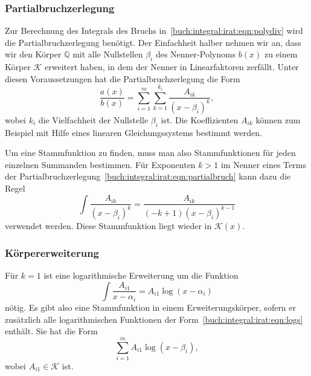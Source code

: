 \subsubsection{Partialbruchzerlegung}
Zur Berechnung des Integrals des Bruchs
in~\eqref{buch:integral:irat:eqn:polydiv} wird die Partialbruchzerlegung
benötigt.
Der Einfachheit halber nehmen wir an, dass wir den Körper $\mathbb{Q}$
mit alle Nullstellen $\beta_i$ des Nenner-Polynoms $b(x)$ zu einem Körper
$\mathscr{K}$ erweitert haben, in dem der Nenner in Linearfaktoren zerfällt.
Unter diesen Voraussetzungen hat die Partialbruchzerlegung die Form
\begin{equation}
\frac{a(x)}{b(x)}
=
\sum_{i=1}^m
\sum_{k=1}^{k_i}
\frac{A_{ik}}{(x-\beta_i)^k},
\label{buch:integral:irat:eqn:partialbruch}
\end{equation}
wobei $k_i$ die Vielfachheit der Nullstelle $\beta_i$ ist.
Die Koeffizienten $A_{ik}$ können zum Beispiel mit Hilfe eines linearen
Gleichungssystems bestimmt werden.

Um eine Stammfunktion zu finden, muss man also Stammfunktionen für
jeden einzelnen Summanden bestimmen.
Für Exponenten $k>1$ im Nenner eines Terms der
Partialbruchzerlegung~\eqref{buch:integral:irat:eqn:partialbruch}
kann dazu die Regel
\[
\int \frac{A_{ik}}{(x-\beta_i)^k}
=
\frac{A_{ik}}{(-k+1)(x-\beta_i)^{k-1}}
\]
verwendet werden.
Diese Stammfunktion liegt wieder in $\mathscr{K}(x)$.

%
%
\subsubsection{Körpererweiterung}
Für $k=1$ ist eine logarithmische Erweiterung um die Funktion
\begin{equation}
\int \frac{A_{i1}}{x-\alpha_i}
=
A_{i1}
\log(x-\alpha_i)
\label{buch:integral:irat:eqn:logs}
\end{equation}
nötig.
Es gibt also eine Stammfunktion in einem Erweiterungskörper, sofern
er zusätzlich alle logarithmischen Funktionen
der Form~\ref{buch:integral:irat:eqn:logs} enthält.
Sie hat die Form
\[
\sum_{i=1}^m A_{i1} \log(x-\beta_i),
\]
wobei $A_{i1}\in\mathscr{K}$ ist.

